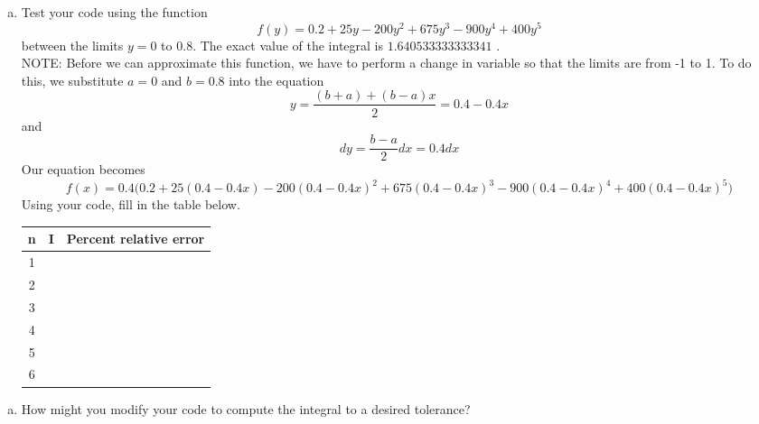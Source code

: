 \documentclass[11pt]{article}
\begin{document}
\begin{enumerate}[(b)]
	\item Test your code using the function
	$$f(y) =  0.2+25y-200y^2+675y^3-900y^4+400y^5$$
	between the limits $y=0$ to $0.8$. The exact value of the integral is $1.640533333333341$ .\\\vspace{10pt}
	NOTE: Before we can approximate this function, we have to perform a change in variable so that the limits are from -1 to 1. To do this, we substitute $a = 0$ and $b= 0.8$ into the equation
	$$ y = \frac{(b+a)+(b-a)x}{2} =0.4-0.4x$$
	and 
	$$ dy = \frac{b-a}{2}dx = 0.4dx$$
	Our equation becomes
	$$f(x) = 0.4 \bigg(0.2+25(0.4-0.4x)-200(0.4-0.4x)^2+675(0.4-0.4x)^3-900(0.4-0.4x)^4+400(0.4-0.4x)^5\bigg)$$ 
	Using your code, fill in the table below.
	
	\begin{table}[H]
		\centering
		\begin{tabular}{|c | c | c|}
			\hline
			n & I & Percent relative error \\
			\hline
			1 & \qquad \qquad \qquad \qquad \qquad \qquad \qquad & \qquad \qquad \qquad \qquad \\
			2 & & \\
			3 & & \\
			4 & & \\
			5 & & \\
			6 & & \\
			\hline
		\end{tabular}
	\end{table}
\end{enumerate}
\begin{enumerate}[(c)]
	\item How might you modify your code to compute the integral to a desired tolerance?
\end{enumerate}
	
\end{document}
